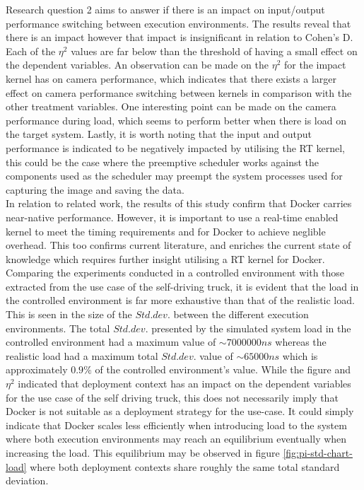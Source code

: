 Research question 2 aims to answer if there is an impact on input/output performance switching between execution environments. The results reveal that there is an impact however that impact is insignificant in relation to Cohen's D. Each of the $\eta^{2}$ values are far below than the threshold of having a small effect on the dependent variables. An observation can be made on the $\eta^{2}$ for the impact kernel has on camera performance, which indicates that there exists a larger effect on camera performance switching between kernels in comparison with the other treatment variables. One interesting point can be made on the camera performance during load, which seems to perform better when there is load on the target system. Lastly, it is worth noting that the input and output performance is indicated to be negatively impacted by utilising the RT kernel, this could be the case where the preemptive scheduler works against the components used as the scheduler may preempt the system processes used for capturing the image and saving the data.\\

In relation to related work, the results of this study confirm that Docker carries near-native performance. However, it is important to use a real-time enabled kernel to meet the timing requirements and for Docker to achieve neglible overhead. This too confirms current literature, and enriches the current state of knowledge which requires further insight utilising a RT kernel for Docker. \\

Comparing the experiments conducted in a controlled environment with those extracted from the use case of the self-driving truck, it is evident that the load in the controlled environment is far more exhaustive than that of the realistic load. This is seen in the size of the $Std.dev.$ between the different execution environments. The total $Std.dev.$ presented by the simulated system load in the controlled environment had a maximum value of $\sim7000000ns$ whereas the realistic load had a maximum total $Std.dev.$ value of $\sim65000ns$ which is approximately $0.9\%$ of the controlled environment's value. While the figure and $\eta^{2}$ indicated that deployment context has an impact on the dependent variables for the use case of the self driving truck, this does not necessarily imply that Docker is not suitable as a deployment strategy for the use-case. It could simply indicate that Docker scales less efficiently when introducing load to the system where both execution environments may reach an equilibrium eventually when increasing the load. This equilibrium may be observed in figure \ref{fig:pi-std-chart-load} where both deployment contexts share roughly the same total standard deviation.\\

